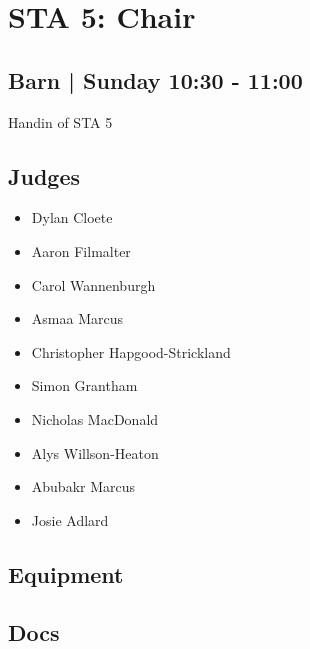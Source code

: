 \documentclass[10pt]{article}
\begin{document}
		\begin{minipage}{\linewidth}
		\setcounter{section}{38}
	\section{STA 5: Chair }
	\subsection*{Barn | Sunday 10:30 - 11:00}

	Handin of STA 5

	\begin{multicols}{2}
	\subsection*{\faUsers \: Judges}
	\begin{itemize}
			\item Dylan Cloete
			\item Aaron Filmalter
			\item Carol Wannenburgh
			\item Asmaa Marcus
			\item Christopher Hapgood-Strickland
			\item Simon Grantham
			\item Nicholas MacDonald
			\item Alys Willson-Heaton
			\item Abubakr Marcus
			\item Josie Adlard
		\end{itemize}
	\columnbreak
	\subsection*{\faWrench \: Equipment}
	        \vfill\null
        \subsection*{\faFile \: Docs}
     	\end{multicols}


	\vspace{1cm}
	\end{minipage}
\end{document}
